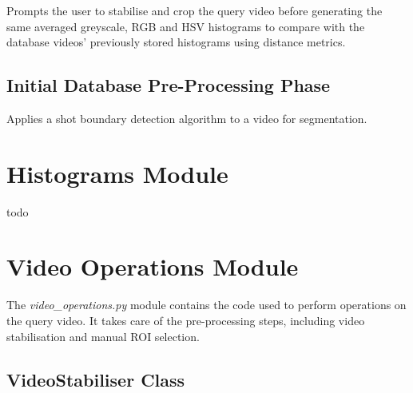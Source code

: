 Prompts the user to stabilise and crop the query video before generating the same averaged greyscale, RGB and HSV histograms to compare with the database videos' previously stored histograms using distance metrics.




\subsection{Initial Database Pre-Processing Phase}
\label{sec:code-database_preprocessing_phase}

Applies a shot boundary detection algorithm to a video for segmentation.




\clearpage
\section{Histograms Module}

todo


\clearpage
\section{Video Operations Module}

The \textit{video\_operations.py} module contains the code used to perform operations on the query video. It takes care of the pre-processing steps, including video stabilisation and manual ROI selection. 


\subsection{VideoStabiliser Class}
\label{sec:code-VideoStabiliser}

